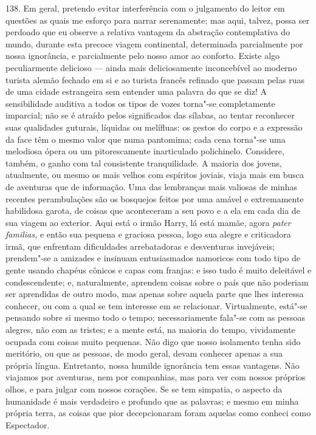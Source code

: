 138. Em geral, pretendo evitar interferência com o julgamento do leitor
em questões as quais me esforço para narrar serenamente; mas aqui,
talvez, possa ser perdoado que eu observe a relativa vantagem da
abstração contemplativa do mundo, durante esta precoce viagem
continental, determinada parcialmente por nossa ignorância, e
parcialmente pelo nosso amor ao conforto. Existe algo peculiarmente
delicioso --- ainda mais deliciosamente inconcebível ao moderno turista
alemão fechado em si e ao turista francês refinado que passam pelas ruas
de uma cidade estrangeira sem entender uma palavra do que se diz! A
sensibilidade auditiva a todos os tipos de vozes torna"-se completamente
imparcial; não se é atraído pelos significados das sílabas, ao tentar
reconhecer suas qualidades guturais, líquidas ou melífluas: os gestos do
corpo e a expressão da face têm o mesmo valor que numa pantomima; cada
cena torna"-se uma melodiosa ópera ou um pitorescamente inarticulado
polichinelo. Considere, também, o ganho com tal consistente
tranquilidade. A maioria dos jovens, atualmente, ou mesmo os mais velhos
com espíritos joviais, viaja mais em busca de aventuras que de
informação. Uma das lembranças mais valiosas de minhas recentes
perambulações são os bosquejos feitos por uma amável e extremamente
habilidosa garota, de coisas que aconteceram a seu povo e a ela em cada
dia de sua viagem ao exterior. Aqui está o irmão Harry, lá está mamãe,
agora \emph{pater familias,} e então sua pequena e graciosa pessoa, logo
sua alegre e criticadora irmã, que enfrentam dificuldades arrebatadoras
e desventuras invejáveis; prendem"-se a amizades e insinuam entusiasmados
namoricos com todo tipo de gente usando chapéus cônicos e capas com
franjas: e isso tudo é muito deleitável e condescendente; e,
naturalmente, aprendem coisas sobre o país que não poderiam ser
aprendidas de outro modo, mas apenas sobre aquela parte que lhes
interessa conhecer, ou com a qual se tem interesse em se relacionar.
Virtualmente, está"-se pensando sobre si mesmo todo o tempo;
necessariamente fala"-se com as pessoas alegres, não com as tristes; e a
mente está, na maioria do tempo, vividamente ocupada com coisas muito
pequenas. Não digo que nosso isolamento tenha sido meritório, ou que as
pessoas, de modo geral, devam conhecer apenas a sua própria língua.
Entretanto, nossa humilde ignorância tem essas vantagens. Não viajamos
por aventuras, nem por companhias, mas para ver com nossos próprios
olhos, e para julgar com nossos corações. Se se tem simpatia, o aspecto
da humanidade é mais verdadeiro e profundo que as palavras; e mesmo em
minha própria terra, as coisas que pior decepcionaram foram aquelas como
conheci como Espectador.

